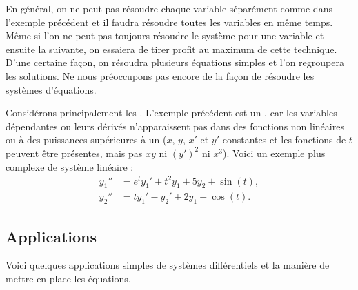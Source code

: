 En général, on ne peut pas résoudre chaque variable séparément comme dans l'exemple précédent et il faudra résoudre toutes les variables en même temps. Même si l'on ne peut pas toujours résoudre le système pour une variable et ensuite la suivante, on essaiera de tirer profit au maximum de cette technique. D’une certaine façon, on résoudra plusieurs équations simples et l'on regroupera les solutions. Ne nous préoccupons pas encore de la façon de résoudre les systèmes d’équations.

Considérons principalement les \emph{}.  L’exemple précédent est un \emph{}, car les variables dépendantes ou leurs dérivés n'apparaissent pas dans des fonctions non linéaires ou à des puissances supérieures à un ($x$, $y$, $x'$ et $y'$ constantes et les fonctions de $t$
peuvent être présentes, mais pas $xy$ ni ${(y')}^2$ ni $x^3$).  Voici un exemple plus complexe de système linéaire :
\begin{align*}
y_1'' &= e^t y_1' + t^2 y_1 + 5 y_2 + \sin(t), \\
y_2'' &= t y_1'-y_2' + 2 y_1 + \cos(t).
\end{align*}

\subsection{Applications}

Voici quelques applications simples de systèmes différentiels et la manière de mettre en place les équations.

